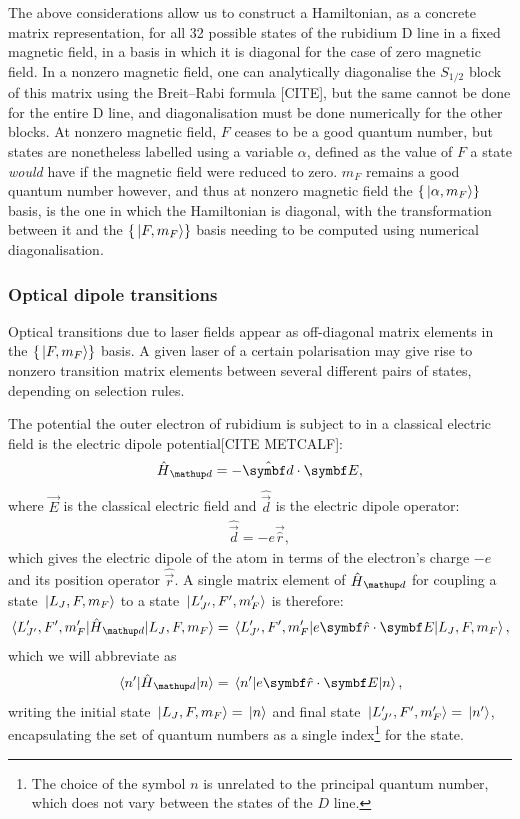 The above considerations allow us to construct a Hamiltonian, as a concrete matrix representation, for all 32 possible states of the rubidium D line in a fixed magnetic field, in a basis in which it is diagonal for the case of zero magnetic field. In a nonzero magnetic field, one can analytically diagonalise the $S_{1/2}$ block of this matrix using the Breit--Rabi formula [CITE], but the same cannot be done for the entire D line, and diagonalisation must be done numerically for the other blocks. At nonzero magnetic field, $F$ ceases to be a good quantum number, but states are nonetheless labelled using a variable $\alpha$, defined as the value of $F$ a state \emph{would} have if the magnetic field were reduced to zero. $m_F$ remains a good quantum number however, and thus at nonzero magnetic field the $\{\ket{\alpha, m_F}\}$ basis, is the one in which the Hamiltonian is diagonal, with the transformation between it and the $\{\ket{F, m_F}\}$ basis needing to be computed using numerical diagonalisation.

\subsubsection{Optical dipole transitions}

Optical transitions due to laser fields appear as off-diagonal matrix elements in the $\{\ket{F, m_F}\}$ basis. A given laser of a certain polarisation may give rise to nonzero transition matrix elements between several different pairs of states, depending on selection rules.

The potential the outer electron of rubidium is subject to in a classical electric field is the electric dipole potential[CITE METCALF]:
\begin{align}
\hat H_\up{d} = -\hat{\vec d}\cdot\vec E,
\end{align}
where $\vec E$ is the classical electric field and $\hat{\vec d}$ is the electric dipole operator:
\begin{align}
\hat{\vec d} = -e\vec{\hat r},
\end{align}
which gives the electric dipole of the atom in terms of the electron's charge $-e$ and its position operator $\hat{\vec r}$. A single matrix element of $\hat H_\up{d}$ for coupling a state $\ket{L_J, F, m_F}$ to a state $\ket{L^\prime_{J^\prime}, F^\prime, m_F^\prime}$ is therefore:
\begin{align}\label{eq:electric_dipole_potential}
\matrixel{L^\prime_{J^\prime}, F^\prime, m_F^\prime}{\hat H_\up{d}}{L_J, F, m_F} = 
\matrixel{L^\prime_{J^\prime}, F^\prime, m_F^\prime}{e\vec{\hat r}\cdot\vec E}{L_J, F, m_F},
\end{align}
which we will abbreviate as
\begin{align}
\matrixel{n^\prime}{\hat H_\up{d}}{n} = 
\matrixel{n^\prime}{e\vec{\hat r}\cdot\vec E}{n},
\end{align}
writing the initial state $\ket{L_J, F, m_F}=\ket{n}$ and final state $\ket{L^\prime_{J^\prime}, F^\prime, m_F^\prime}=\ket{n^\prime}$, encapsulating the set of quantum numbers as a single index\footnote{The choice of the symbol $n$ is unrelated to the principal quantum number, which does not vary between the states of the $D$ line.} for the state.

